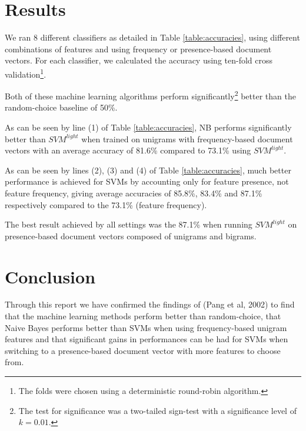 \documentclass[12pt]{article}
\begin{document}
\begin{multicols}{2}
\section{Results}

We ran 8 different classifiers as detailed in Table \ref{table:accuracies}, using different combinations of features and using frequency or presence-based document vectors. For each classifier, we calculated the accuracy using ten-fold cross validation\footnote{The folds were chosen using a deterministic round-robin algorithm.}.

Both of these machine learning algorithms perform significantly\footnote{The test for significance was a two-tailed sign-test with a significance level of $k=0.01.$} better than the random-choice baseline of 50\%.

As can be seen by line (1) of Table \ref{table:accuracies}, NB performs significantly better than $SVM^{light}$ when trained on unigrams with frequency-based document vectors with an average accuracy of 81.6\% compared
to 73.1\% using $SVM^{light}$.

As can be seen by lines (2), (3) and (4) of Table \ref{table:accuracies}, much better performance is achieved for SVMs by accounting only for feature presence, not feature frequency, giving average accuracies of 85.8\%, 83.4\% and 87.1\% respectively compared to the 73.1\% (feature frequency).

The best result achieved by all settings was the 87.1\% when running $SVM^{light}$ on presence-based document vectors composed of unigrams and bigrams.

\section*{Conclusion}

Through this report we have confirmed the findings of (Pang et al, 2002) to find that the machine learning methods perform better than random-choice, that Naive Bayes performs better than SVMs when using frequency-based unigram features and that significant gains in performances can be had for SVMs when switching to a presence-based document vector with more features to choose from.

\end{multicols}
\end{document}

